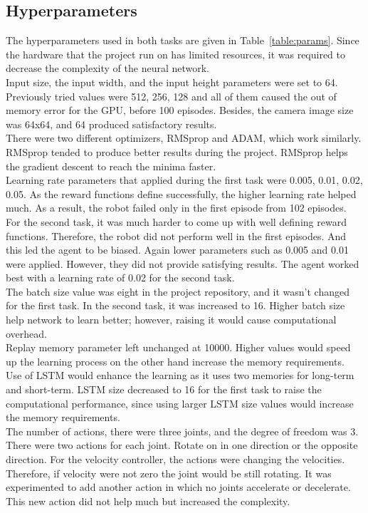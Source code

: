 \documentclass[10pt,journal,compsoc]{IEEEtran}
\begin{document}
\subsection{Hyperparameters}
The hyperparameters used in both tasks are given in Table~\ref{table:params}. Since the hardware that the project run on has limited resources, it was required to decrease the complexity of the neural network.\\
Input size, the input width, and the input height parameters were set to 64. Previously tried values were 512, 256, 128 and all of them caused the out of memory error for the GPU, before 100 episodes. Besides, the camera image size was 64x64, and 64 produced satisfactory results.\\
There were two different optimizers, RMSprop and ADAM, which work similarly. RMSprop tended to produce better results during the project. RMSprop helps the gradient descent to reach the minima faster.\\
Learning rate parameters that applied during the first task were 0.005, 0.01, 0.02, 0.05. As the reward functions define successfully, the higher learning rate helped much. As a result, the robot failed only in the first episode from 102 episodes.\\
For the second task, it was much harder to come up with well defining reward functions. Therefore, the robot did not perform well in the first episodes. And this led the agent to be biased. Again lower parameters such as 0.005 and 0.01 were applied. However, they did not provide satisfying results. The agent worked best with a learning rate of 0.02 for the second task.\\
The batch size value was eight in the project repository, and it wasn't changed for the first task. In the second task, it was increased to 16. Higher batch size help network to learn better; however, raising it would cause computational overhead.\\
Replay memory parameter left unchanged at 10000. Higher values would speed up the learning process on the other hand increase the memory requirements. \\
Use of LSTM would enhance the learning as it uses two memories for long-term and short-term. LSTM size decreased to 16 for the first task to raise the computational performance, since using larger LSTM size values would increase the memory requirements. \\
The number of actions, there were three joints, and the degree of freedom was 3. There were two actions for each joint. Rotate on in one direction or the opposite direction. For the velocity controller, the actions were changing the velocities. Therefore, if velocity were not zero the joint would be still rotating. It was experimented to add another action in which no joints accelerate or decelerate. This new action did not help much but increased the complexity.
\end{document}

